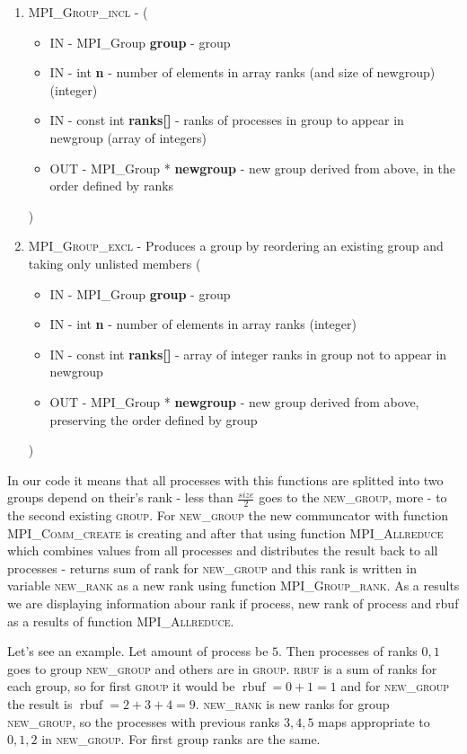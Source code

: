 \documentclass[%
12pt, %
final, %
oneside, %
onecolumn, %
centertags]{article} %
\theoremstyle{plain}
\theoremstyle{definition}
\theoremstyle{remark}
\begin{document}
\begin{enumerate}
	\item \textsc{MPI\_Group\_incl} -  (
	\begin{itemize}
		\item IN - MPI\_Group \textbf{group} - group
		\item IN - int \textbf{n} - number of elements in array ranks (and size of newgroup) (integer)
		\item IN - const int \textbf{ranks[]} - ranks of processes in group to appear in newgroup (array of integers)
		\item OUT - MPI\_Group * \textbf{newgroup} - new group derived from above, in the order defined by ranks
	\end{itemize}
	)
	\item \textsc{MPI\_Group\_excl} - Produces a group by reordering an existing group and taking only unlisted members
	(
	\begin{itemize}
		\item IN - MPI\_Group \textbf{group} - group
		\item IN - int \textbf{n} - number of elements in array ranks (integer)
		\item IN - const int \textbf{ranks[]} - array of integer ranks in group not to appear in newgroup
		\item OUT - MPI\_Group * \textbf{newgroup} - new group derived from above, preserving the order defined by group
	\end{itemize}
	)
\end{enumerate}

In our code it means that all processes with this functions are splitted into two groups depend on their's rank - less than $\frac{size}{2}$ goes to the \textsc{new\_group}, more - to the second existing \textsc{group}. For \textsc{new\_group} the new communcator with function \textsc{MPI\_Comm\_create} is creating and after that using function \textsc{MPI\_Allreduce} which combines values from all processes and distributes the result back to all processes - returns sum of rank for \textsc{new\_group} and this rank is written in variable \textsc{new\_rank} as a new rank using function \textsc{MPI\_Group\_rank}. As a results we are displaying information abour rank if process, new rank of process and rbuf as a results of function \textsc{MPI\_Allreduce}.

Let's see an example. Let amount of process be $5$. Then processes of ranks $0, 1$ goes to group \textsc{new\_group} and others are in \textsc{group}. \textsc{rbuf} is a sum of ranks for each group, so for first \textsc{group} it would be $\operatorname{rbuf}=0+1=1$ and for \textsc{new\_group} the result is $\operatorname{rbuf}=2+3+4=9$. \textsc{new\_rank} is new ranks for group \textsc{new\_group}, so the processes with previous ranks $3, 4, 5$ maps appropriate to $0, 1, 2$ in \textsc{new\_group}. For first group ranks are the same.
\end{document}
